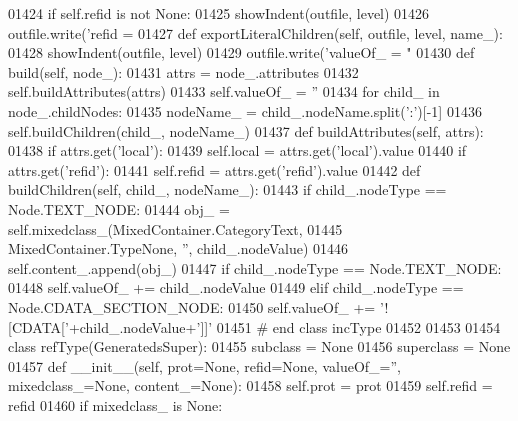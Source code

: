 \begin{DoxyCode}
{{{{{{{{{{{{{{{{{{{{{{{{{{{{{{{{{{{{{{{{{{{{{{{{{{{{{{{{{{{{{{{{{{{{{{{{{{{{{{{{{{{{{{01424         \textcolor{keywordflow}{if} self.refid \textcolor{keywordflow}{is} \textcolor{keywordflow}{not} \textcolor{keywordtype}{None}:
01425             showIndent(outfile, level)
01426             outfile.write(\textcolor{stringliteral}{'refid = %
01427     \textcolor{keyword}{def }exportLiteralChildren(self, outfile, level, name\_):
01428         showIndent(outfile, level)
01429         outfile.write(\textcolor{stringliteral}{'valueOf\_ = "%
01430     \textcolor{keyword}{def }build(self, node\_):
01431         attrs = node\_.attributes
01432         self.buildAttributes(attrs)
01433         self.valueOf_ = \textcolor{stringliteral}{''}
01434         \textcolor{keywordflow}{for} child\_ \textcolor{keywordflow}{in} node\_.childNodes:
01435             nodeName\_ = child\_.nodeName.split(\textcolor{stringliteral}{':'})[-1]
01436             self.buildChildren(child\_, nodeName\_)
01437     \textcolor{keyword}{def }buildAttributes(self, attrs):
01438         \textcolor{keywordflow}{if} attrs.get(\textcolor{stringliteral}{'local'}):
01439             self.local = attrs.get(\textcolor{stringliteral}{'local'}).value
01440         \textcolor{keywordflow}{if} attrs.get(\textcolor{stringliteral}{'refid'}):
01441             self.refid = attrs.get(\textcolor{stringliteral}{'refid'}).value
01442     \textcolor{keyword}{def }buildChildren(self, child\_, nodeName\_):
01443         \textcolor{keywordflow}{if} child\_.nodeType == Node.TEXT\_NODE:
01444             obj\_ = self.mixedclass_(MixedContainer.CategoryText,
01445                 MixedContainer.TypeNone, \textcolor{stringliteral}{''}, child\_.nodeValue)
01446             self.content\_.append(obj\_)
01447         \textcolor{keywordflow}{if} child\_.nodeType == Node.TEXT\_NODE:
01448             self.valueOf_ += child\_.nodeValue
01449         \textcolor{keywordflow}{elif} child\_.nodeType == Node.CDATA\_SECTION\_NODE:
01450             self.valueOf_ += \textcolor{stringliteral}{'![CDATA['}+child\_.nodeValue+\textcolor{stringliteral}{']]'}
01451 \textcolor{comment}{# end class incType}
01452 
01453 
01454 \textcolor{keyword}{class }refType(GeneratedsSuper):
01455     subclass = \textcolor{keywordtype}{None}
01456     superclass = \textcolor{keywordtype}{None}
01457     \textcolor{keyword}{def }__init__(self, prot=None, refid=None, valueOf\_='', mixedclass\_=None, content\_=None):
01458         self.prot = prot
01459         self.refid = refid
01460         \textcolor{keywordflow}{if} mixedclass\_ \textcolor{keywordflow}{is} \textcolor{keywordtype}{None}:
}}}}}}}}}}}}}}}}}}}}}}}}}}}}}}}}}}}}}}}}}}}}}}}}}}}}}}}}}}}}}}}}}}}}}}}}}}}}}}}}}}}}}}}}
\end{DoxyCode}
